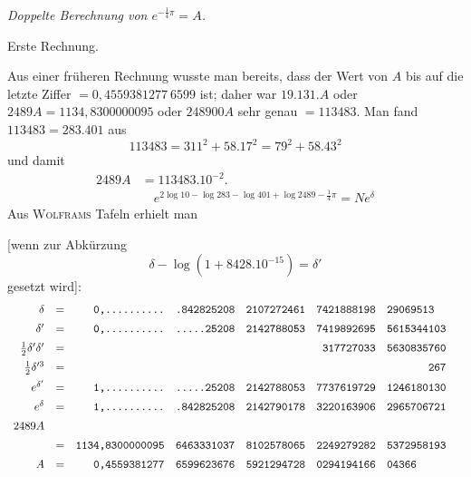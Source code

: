 \begingroup
\renewcommand{\arraystretch}{1.45}
\newcommand{\GaussIIITranscriptionDigits}[1]{\text{\ttfamily #1}}
\begin{center}\textit{Doppelte Berechnung von $e^{-\frac14\pi}=A$.}\end{center}
\begin{center}Erste Rechnung.\end{center}

Aus einer früheren Rechnung wusste man bereits, dass der
Wert von $A$ bis auf die letzte Ziffer $=0,4559381277\ 6599$ ist; daher war
$19.131.A$ oder $2489A=1134,8300000095$ oder $248900A$ sehr genau $=113483$.
Man fand $113483=283.401$ aus
\[
113483=311^2+58.17^2=79^2+58.43^2
\]
und damit
\[
\begin{aligned}2489A&=113483.10^{-2}.\\[7pt]&\quad{}e^{2\log10-\log283-\log401+\log2489-\frac14\pi}=Ne^\delta\end{aligned}
\]
Aus \textsc{Wolframs} Tafeln erhielt man

[wenn zur Abkürzung
\[
\delta-\log(1+8428.10^{-15})=\delta'
\]
gesetzt wird]:
\begingroup\footnotesize\setlength{\arraycolsep}{1pt}\renewcommand{\arraystretch}{1.12}\[
\begin{array}{rcrlllll}
\delta&=&\GaussIIITranscriptionDigits{0,..........}&\GaussIIITranscriptionDigits{.842825208}&\GaussIIITranscriptionDigits{2107272461}&\GaussIIITranscriptionDigits{7421888198}&\GaussIIITranscriptionDigits{29069513}&\\[5pt]
\delta'&=&\GaussIIITranscriptionDigits{0,..........}&\GaussIIITranscriptionDigits{.....25208}&\GaussIIITranscriptionDigits{2142788053}&\GaussIIITranscriptionDigits{7419892695}&\GaussIIITranscriptionDigits{5615344103}&\\[5pt]
\frac12\delta'\delta'&=&&&&\GaussIIITranscriptionDigits{\phantom{0}317727033}&\GaussIIITranscriptionDigits{5630835760}&\\[5pt]
\frac12\delta'^3&=&&&&&\GaussIIITranscriptionDigits{\phantom{0000000}267}&\\[5pt]
e^{\delta'}&=&\GaussIIITranscriptionDigits{1,..........}&\GaussIIITranscriptionDigits{.....25208}&\GaussIIITranscriptionDigits{2142788053}&\GaussIIITranscriptionDigits{7737619729}&\GaussIIITranscriptionDigits{1246180130}&\\[5pt]
e^\delta&=&\GaussIIITranscriptionDigits{1,..........}&\GaussIIITranscriptionDigits{.842825208}&\GaussIIITranscriptionDigits{2142790178}&\GaussIIITranscriptionDigits{3220163906}&\GaussIIITranscriptionDigits{2965706721}&\\[5pt]
2489A&&&&&&&\\[5pt]
&=&\GaussIIITranscriptionDigits{1134,8300000095}&\GaussIIITranscriptionDigits{6463331037}&\GaussIIITranscriptionDigits{8102578065}&\GaussIIITranscriptionDigits{2249279282}&\GaussIIITranscriptionDigits{5372958193}&\\[5pt]
A&=&\GaussIIITranscriptionDigits{0,4559381277}&\GaussIIITranscriptionDigits{6599623676}&\GaussIIITranscriptionDigits{5921294728}&\GaussIIITranscriptionDigits{0294194166}&\GaussIIITranscriptionDigits{04366}&
\end{array}
\]\endgroup

